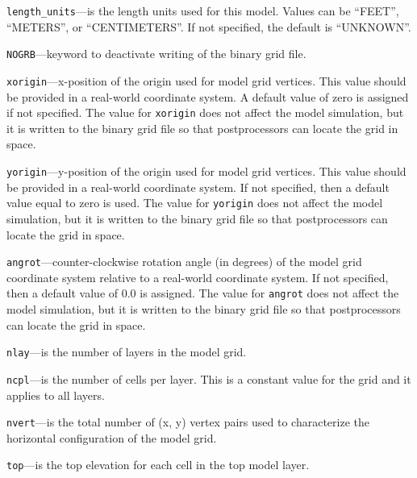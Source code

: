 
\item \texttt{length\_units}---is the length units used for this model.  Values can be ``FEET'', ``METERS'', or ``CENTIMETERS''.  If not specified, the default is ``UNKNOWN''.

\item \texttt{NOGRB}---keyword to deactivate writing of the binary grid file.

\item \texttt{xorigin}---x-position of the origin used for model grid vertices.  This value should be provided in a real-world coordinate system.  A default value of zero is assigned if not specified.  The value for \texttt{xorigin} does not affect the model simulation, but it is written to the binary grid file so that postprocessors can locate the grid in space.

\item \texttt{yorigin}---y-position of the origin used for model grid vertices.  This value should be provided in a real-world coordinate system.  If not specified, then a default value equal to zero is used.  The value for \texttt{yorigin} does not affect the model simulation, but it is written to the binary grid file so that postprocessors can locate the grid in space.

\item \texttt{angrot}---counter-clockwise rotation angle (in degrees) of the model grid coordinate system relative to a real-world coordinate system.  If not specified, then a default value of 0.0 is assigned.  The value for \texttt{angrot} does not affect the model simulation, but it is written to the binary grid file so that postprocessors can locate the grid in space.

\item \texttt{nlay}---is the number of layers in the model grid.

\item \texttt{ncpl}---is the number of cells per layer.  This is a constant value for the grid and it applies to all layers.

\item \texttt{nvert}---is the total number of (x, y) vertex pairs used to characterize the horizontal configuration of the model grid.

\item \texttt{top}---is the top elevation for each cell in the top model layer.

